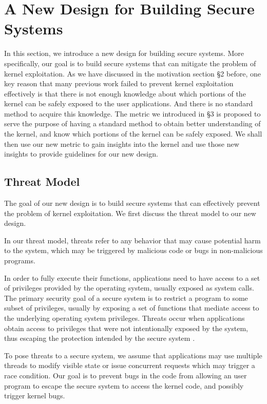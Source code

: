 \section{A New Design for Building Secure Systems}
\label{sec.design}

In this section, we introduce a new design for building secure systems. More specifically, our goal is to 
build secure systems that can mitigate the problem of kernel exploitation. As we have discussed in 
the motivation section \S{2} before, one key reason that many previous work failed to prevent kernel exploitation
effectively is that there is not enough knowledge about which portions of the kernel can be safely exposed
to the user applications. And there is no standard method to acquire this knowledge. The metric we introduced
in \S{3} is proposed to serve the purpose of having a standard method to obtain better understanding of the 
kernel, and know which portions of the kernel can be safely exposed. We shall then use our new metric to 
gain insights into the kernel and use those new insights to provide guidelines for our new design. 

\subsection{Threat Model}
The goal of our new design is to build secure systems that can effectively prevent the problem
of kernel exploitation. We first discuss the threat model to our new design.

In our threat model, threats refer to any behavior that may cause potential harm to the system, 
which may be triggered by malicious code or bugs in non-malicious programs.

In order to fully execute their functions, applications need to have access to a set of privileges provided by 
the operating system, usually exposed as system calls. The primary security goal of a secure system is to 
restrict a program to some subset of privileges, usually by exposing a set of functions that mediate 
access to the underlying operating system privileges. Threats occur when applications obtain access to 
privileges that were not intentionally exposed by the system, thus escaping the protection 
intended by the secure system \cite{Repy:10}.

To pose threats to a secure system, we assume that applications may use multiple threads to modify visible 
state or issue concurrent requests which may trigger a race condition. Our goal is to prevent bugs in 
the code from allowing an user program to escape the secure system to access the kernel code, and 
possibly trigger kernel bugs.

